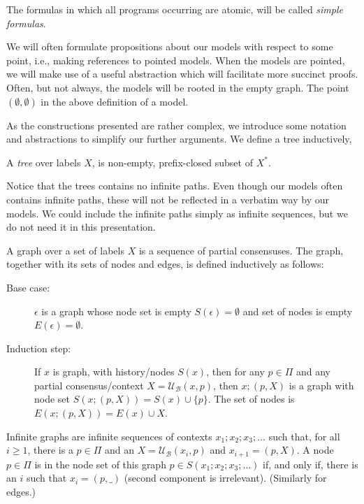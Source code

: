 \documentclass{llncs}
\newcommand{\update}[3]{{\mathcal U}_{#1}(#2,#3)}
\newcommand{\views}{\mathcal B}
\begin{document}
The formulas in which all programs occurring are atomic, will be called \emph{simple formulas}.

We will often formulate propositions about our models with respect to some point, i.e., making references to pointed models. When the models are pointed, we will make use of a useful abstraction which will facilitate more succinct proofs. Often, but not always, the models will be rooted in the empty graph. The point $(\emptyset, \emptyset)$ in the above definition of a model. 

As the constructions presented are rather complex, we introduce some notation and abstractions to simplify our further arguments. We define a tree inductively, 
\begin{definition}[Tree]A \emph{tree} over labels $X$, is non-empty, prefix-closed subset of $X^*$. 
\end{definition}

Notice that the trees contains no infinite paths. Even though our models often contains infinite paths, these will not be reflected in a verbatim way by our models. We could include the infinite paths simply as infinite sequences, but we do not need it in this presentation. 

\begin{definition} A graph over a set of labels $X$ is a sequence of partial consensuses. The graph, together with its sets of nodes and edges, is defined inductively as follows:
\begin{description}
\item [Base case:] $\epsilon$ is a graph whose node set is empty $S(\epsilon) = \emptyset$ and set of nodes is empty $E(\epsilon) = \emptyset$.
\item [Induction step:] If $x$ is graph, with history/nodes $S(x)$, then for any $p \in \Pi$ and any partial consensus/context $X = \update \views x p$, then $x;(p, X)$ is a graph with node set $S(x;(p, X)) = S(x) \cup \{p\}$. The set of nodes is $E(x;(p, X)) = E(x) \cup X$.
\end{description}
Infinite graphs are infinite sequences of contexts $x_1;x_2;x_3;\dots$ such that, for all $i \geq 1$, there is a $p \in \Pi$ and an $X = \update \views {x_i} p$ and $x_{i+1} = (p, X)$. A node $p \in \Pi$ is in the node set of this graph $p \in S(x_1;x_2;x_3;\dots)$ if, and only if, there is an $i$ such that $x_i = (p, \_)$ (second component is irrelevant). (Similarly for edges.)
\end{definition}
\end{document}
